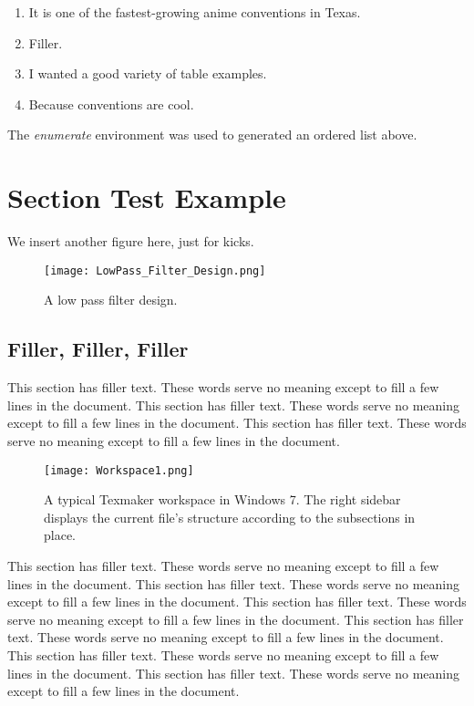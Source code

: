 \begin{enumerate}
\item It is one of the fastest-growing anime conventions in Texas.
\item Filler.
\item I wanted a good variety of table examples.
\item Because conventions are cool.
\end{enumerate}

The \textit{enumerate} environment was used to generated an ordered list above.

\section{Section Test Example}
We insert another figure here, just for kicks.

\begin{figure}[ht]
	\centering
	\texttt{[image: LowPass\_Filter\_Design.png]}
	\caption{A low pass filter design.}
\end{figure}

\subsection{Filler, Filler, Filler}

This section has filler text. These words serve no meaning except to fill a few lines in the document. This section has filler text. These words serve no meaning except to fill a few lines in the document. This section has filler text. These words serve no meaning except to fill a few lines in the document.

\begin{figure}[t]
	\centering
	\texttt{[image: Workspace1.png]}
	\caption{A typical Texmaker workspace in Windows 7. The right sidebar displays the current file's structure according to the subsections in place.}
\end{figure}

This section has filler text. These words serve no meaning except to fill a few lines in the document. This section has filler text. These words serve no meaning except to fill a few lines in the document. This section has filler text. These words serve no meaning except to fill a few lines in the document. This section has filler text. These words serve no meaning except to fill a few lines in the document. This section has filler text. These words serve no meaning except to fill a few lines in the document. This section has filler text. These words serve no meaning except to fill a few lines in the document.

